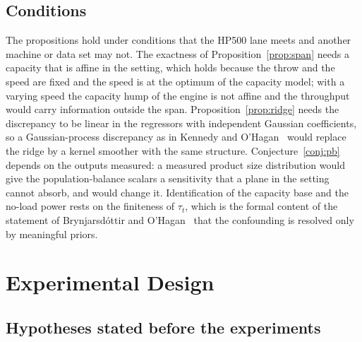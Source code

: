 \documentclass[journal]{IEEEtran}
\begin{document}
\subsection{Conditions}

The propositions hold under conditions that the HP500 lane meets and another machine or data set may not. The exactness of
Proposition~\ref{prop:span} needs a capacity that is affine in the setting, which holds because the throw and the speed
are fixed and the speed is at the optimum of the capacity model; with a varying speed the capacity hump of the engine is
not affine and the throughput would carry information outside the span. Proposition~\ref{prop:ridge} needs the
discrepancy to be linear in the regressors with independent Gaussian coefficients, so a Gaussian-process discrepancy as in
Kennedy and O'Hagan~\cite{ko} would replace the ridge by a kernel smoother with the same structure. Conjecture~\ref{conj:pb}
depends on the outputs measured: a measured product size distribution would give the population-balance scalars a
sensitivity that a plane in the setting cannot absorb, and would change it. Identification of the capacity base and the
no-load power rests on the finiteness of $\tau_t$, which is the formal content of the statement of Brynjarsd\'ottir and
O'Hagan~\cite{brynj} that the confounding is resolved only by meaningful priors.

\section{Experimental Design}\label{sec:design}

\subsection{Hypotheses stated before the experiments}
\end{document}
